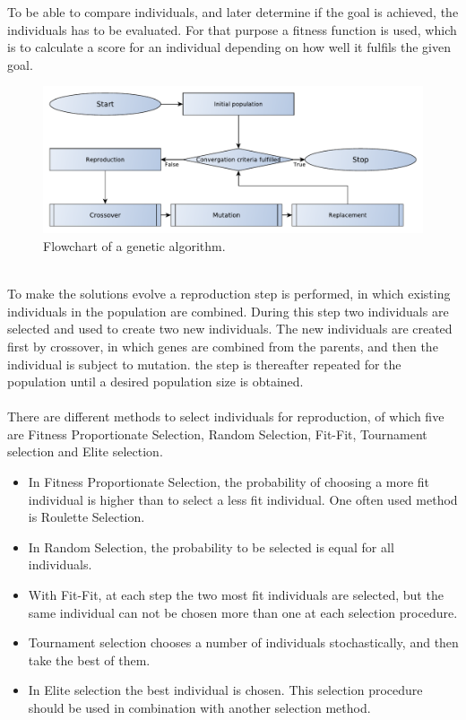 To be able to compare individuals, and later determine if the goal is achieved, the individuals has to be evaluated. For that purpose a fitness function is used, which is to calculate a score for an individual depending on how well it fulfils the given goal.
\begin{figure}[!htb]
	\centering
	\includegraphics[width=\textwidth]{chapter_4_methods/GeneticFlowChart-Generic}
  	\caption[Flowchart of a genetic algorithm]
  	{Flowchart of a genetic algorithm.}
	\label{GeneticFlowChart-generic}
\end{figure}
\\To make the solutions evolve a reproduction step is performed, in which existing individuals in the population are combined. During this step two individuals are selected and used to create two new individuals. The new individuals are created first by crossover, in which genes are combined from the parents, and then the individual is subject to mutation. the step is thereafter repeated for the population until a desired population size is obtained.\\\\
There are different methods to select individuals for reproduction, of which five are Fitness Proportionate Selection, Random Selection, Fit-Fit, Tournament selection and Elite selection.
\begin{itemize}
\item In Fitness Proportionate Selection, the probability of choosing a more fit individual is higher than to select a less fit individual. One often used method is Roulette Selection.%
\item In Random Selection, the probability to be selected is equal for all individuals. 
\item With Fit-Fit, at each step the two most fit individuals are selected, but the same individual can not be chosen more than one at each selection procedure.
\item Tournament selection chooses a number of individuals stochastically, and then take the best of them.
\item In Elite selection the best individual is chosen. This selection procedure should be used in combination with another selection method.
\end{itemize}
